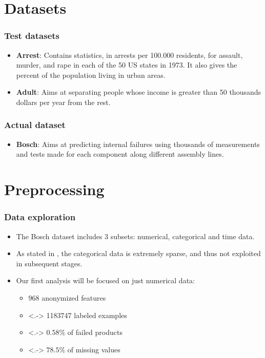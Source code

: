 \documentclass{beamer}
\begin{document}
\section{Datasets}
\begin{frame}
  \frametitle{Test datasets}
  \begin{itemize}[<+->]
    \item \textbf{Arrest}: Contains statistics, in arrests per 100.000 residents, for assault, murder, and rape in each of the 50 US states in 1973. 
          It also gives the percent of the population living in urban areas.
    \item \textbf{Adult}: Aims at separating people whose income is greater than 50 thousands dollars per year from the rest.
  \end{itemize}	
\end{frame}

\begin{frame}
  \frametitle{Actual dataset}
  \begin{itemize}[<+->]
    \item \textbf{Bosch}: Aims at predicting internal failures using thousands of measurements and tests made for each component along different assembly lines.
  \end{itemize}
\end{frame}

\section{Preprocessing}
\begin{frame}
  \frametitle{Data exploration}
  \begin{itemize}[<+->]
    \item The Bosch dataset includes 3 subsets: numerical, categorical and time data.
    \item As stated in \cite{predict-failures}, the categorical data is extremely sparse, and thus not exploited in subsequent stages.
    \item Our first analysis will be focused on just numerical data:
    \begin{itemize} 
      \item $968$ anonymized features
      \item<.-> \num{1183747} labeled examples
      \item<.-> $0.58\%$ of failed products
      \item<.-> $78.5\%$ of missing values
    \end{itemize}
  \end{itemize}
\end{frame}
\end{document}
